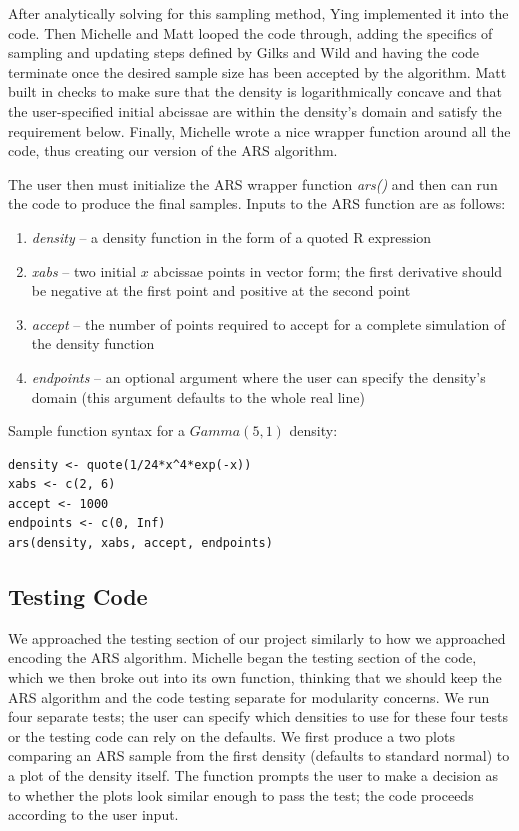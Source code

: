 \documentclass{article}
\begin{document}
After analytically solving for this sampling method, Ying implemented it into the code.  Then Michelle and Matt looped the code through, adding the specifics of sampling and updating steps defined by Gilks and Wild and having the code terminate once the desired sample size has been accepted by the algorithm.  Matt built in checks to make sure that the density is logarithmically concave and that the user-specified initial abcissae are within the density's domain and satisfy the requirement below.  Finally, Michelle wrote a nice wrapper function around all the code, thus creating our version of the ARS algorithm.

The user then must initialize the ARS wrapper function \textit{ars()} and then can run the code to produce the final samples. Inputs to the ARS function are as follows:
\begin{enumerate}
\item \textit{density} -- a density function in the form of a quoted R expression
\item \textit{xabs} -- two initial $x$ abcissae points in vector form; the first derivative should be negative at the first point and positive at the second point
\item \textit{accept} -- the number of points required to accept for a complete simulation of the density function
\item \textit{endpoints} -- an optional argument where the user can specify the density's domain (this argument defaults to the whole real line)
\end{enumerate}
Sample function syntax for a $Gamma\left(5,1\right)$ density:

\begin{lstlisting}
density <- quote(1/24*x^4*exp(-x))
xabs <- c(2, 6)
accept <- 1000
endpoints <- c(0, Inf)
ars(density, xabs, accept, endpoints)
\end{lstlisting}


\subsection{Testing Code}
We approached the testing section of our project similarly to how we approached encoding the ARS algorithm.  Michelle began the testing section of the code, which we then broke out into its own function, thinking that we should keep the ARS algorithm and the code testing separate for modularity concerns.  We run four separate tests; the user can specify which densities to use for these four tests or the testing code can rely on the defaults.  We first produce a two plots comparing an ARS sample from the first density (defaults to standard normal) to a plot of the density itself.  The function prompts the user to make a decision as to whether the plots look similar enough to pass the test; the code proceeds according to the user input.
\end{document}
